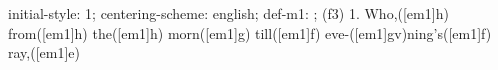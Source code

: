 initial-style: 1;
centering-scheme: english;
def-m1: \grealign;
(f3) 1. Who,([em1]h) from([em1]h) the([em1]h) morn([em1]g) till([em1]f) eve-([em1]gv)ning's([em1]f) ray,([em1]e)